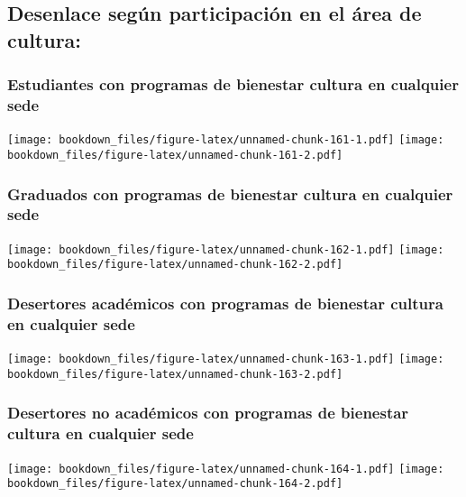 \documentclass[]{article}
\theoremstyle{definition}
\theoremstyle{definition}
\theoremstyle{definition}
\theoremstyle{remark}
\begin{document}
\subsection{Desenlace según participación en el área de
cultura:}\label{desenlace-segun-participacion-en-el-area-de-cultura}

\subsubsection{Estudiantes con programas de bienestar cultura en
cualquier
sede}\label{estudiantes-con-programas-de-bienestar-cultura-en-cualquier-sede}

\texttt{[image: bookdown\_files/figure-latex/unnamed-chunk-161-1.pdf]}
\texttt{[image: bookdown\_files/figure-latex/unnamed-chunk-161-2.pdf]}

\subsubsection{Graduados con programas de bienestar cultura en cualquier
sede}\label{graduados-con-programas-de-bienestar-cultura-en-cualquier-sede}

\texttt{[image: bookdown\_files/figure-latex/unnamed-chunk-162-1.pdf]}
\texttt{[image: bookdown\_files/figure-latex/unnamed-chunk-162-2.pdf]}

\subsubsection{Desertores académicos con programas de bienestar cultura
en cualquier
sede}\label{desertores-academicos-con-programas-de-bienestar-cultura-en-cualquier-sede}

\texttt{[image: bookdown\_files/figure-latex/unnamed-chunk-163-1.pdf]}
\texttt{[image: bookdown\_files/figure-latex/unnamed-chunk-163-2.pdf]}

\subsubsection{Desertores no académicos con programas de bienestar
cultura en cualquier
sede}\label{desertores-no-academicos-con-programas-de-bienestar-cultura-en-cualquier-sede}

\texttt{[image: bookdown\_files/figure-latex/unnamed-chunk-164-1.pdf]}
\texttt{[image: bookdown\_files/figure-latex/unnamed-chunk-164-2.pdf]}

\subsubsection{}\label{section}
\end{document}
